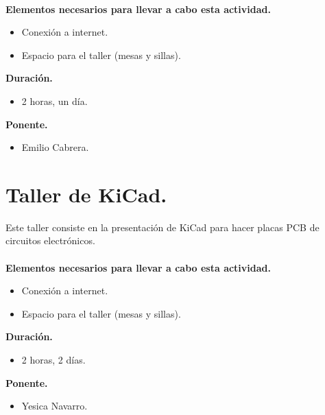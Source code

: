 \documentclass[a4paper,11pt]{article}                 %
\begin{document}
      \paragraph{}
  \textbf{Elementos necesarios para llevar a cabo esta actividad.}
  \begin{itemize}
    \label{list:impresion}
    \item Conexión a internet.
    \item Espacio para el taller (mesas y sillas).
  \end{itemize}
  
  \textbf{Duración.}
  \begin{itemize}
    \item 2 horas, un día.
  \end{itemize}
  
              \textbf{Ponente.}
  \begin{itemize}
    \item Emilio Cabrera.
  \end{itemize}
  
  
              \section{Taller de KiCad.}                                     %

   Este taller consiste en la presentación de KiCad para hacer placas PCB de circuitos electrónicos.
      \paragraph{}
  \textbf{Elementos necesarios para llevar a cabo esta actividad.}
  \begin{itemize}
  \label{list:kicad}
    \item Conexión a internet.
    \item Espacio para el taller (mesas y sillas).
  \end{itemize}
  
  \textbf{Duración.}
  \begin{itemize}
    \item 2 horas, 2 días.
  \end{itemize}
  
              \textbf{Ponente.}
  \begin{itemize}
    \item Yesica Navarro.
  \end{itemize}
  
\end{document}

